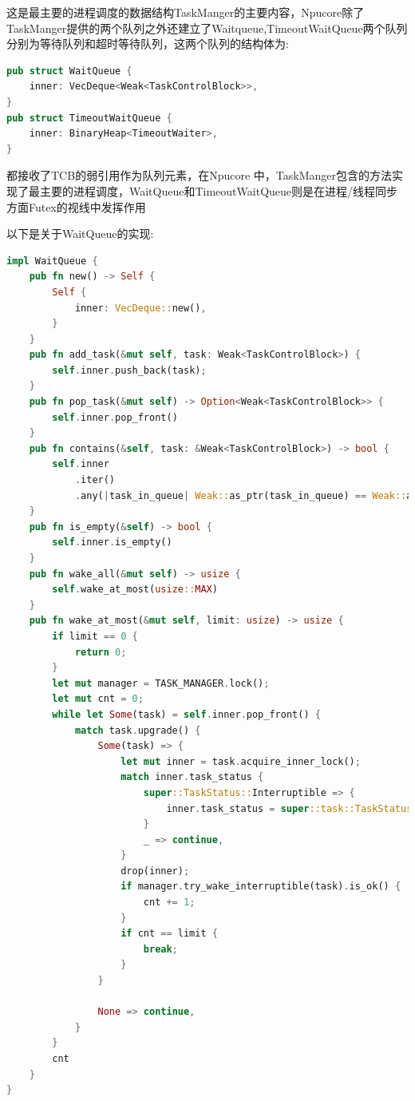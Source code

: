这是最主要的进程调度的数据结构TaskManger的主要内容，Npucore除了TaskManger提供的两个队列之外还建立了Waitqueue,TimeoutWaitQueue两个队列分别为等待队列和超时等待队列，这两个队列的结构体为:
\begin{lstlisting}[language=rust,caption={数据结构WaitQueue与TimeoutWaitQueue}]
    pub struct WaitQueue {
    inner: VecDeque<Weak<TaskControlBlock>>,
}
pub struct TimeoutWaitQueue {
    inner: BinaryHeap<TimeoutWaiter>,
}
\end{lstlisting}
都接收了TCB的弱引用作为队列元素，在Npucore 中，TaskManger包含的方法实现了最主要的进程调度，WaitQueue和TimeoutWaitQueue则是在进程/线程同步方面Futex的视线中发挥作用

以下是关于WaitQueue的实现:
\begin{lstlisting}[language=rust,caption={数据结构WaitQueue下的方法}]
    impl WaitQueue {
    pub fn new() -> Self {
        Self {
            inner: VecDeque::new(),
        }
    }
    pub fn add_task(&mut self, task: Weak<TaskControlBlock>) {
        self.inner.push_back(task);
    }
    pub fn pop_task(&mut self) -> Option<Weak<TaskControlBlock>> {
        self.inner.pop_front()
    }
    pub fn contains(&self, task: &Weak<TaskControlBlock>) -> bool {
        self.inner
            .iter()
            .any(|task_in_queue| Weak::as_ptr(task_in_queue) == Weak::as_ptr(task))
    }
    pub fn is_empty(&self) -> bool {
        self.inner.is_empty()
    }
    pub fn wake_all(&mut self) -> usize {
        self.wake_at_most(usize::MAX)
    }
    pub fn wake_at_most(&mut self, limit: usize) -> usize {
        if limit == 0 {
            return 0;
        }
        let mut manager = TASK_MANAGER.lock();
        let mut cnt = 0;
        while let Some(task) = self.inner.pop_front() {
            match task.upgrade() {
                Some(task) => {
                    let mut inner = task.acquire_inner_lock();
                    match inner.task_status {
                        super::TaskStatus::Interruptible => {
                            inner.task_status = super::task::TaskStatus::Ready
                        }
                        _ => continue,
                    }
                    drop(inner);
                    if manager.try_wake_interruptible(task).is_ok() {
                        cnt += 1;
                    }
                    if cnt == limit {
                        break;
                    }
                }
            
                None => continue,
            }
        }
        cnt
    }
}
\end{lstlisting}
